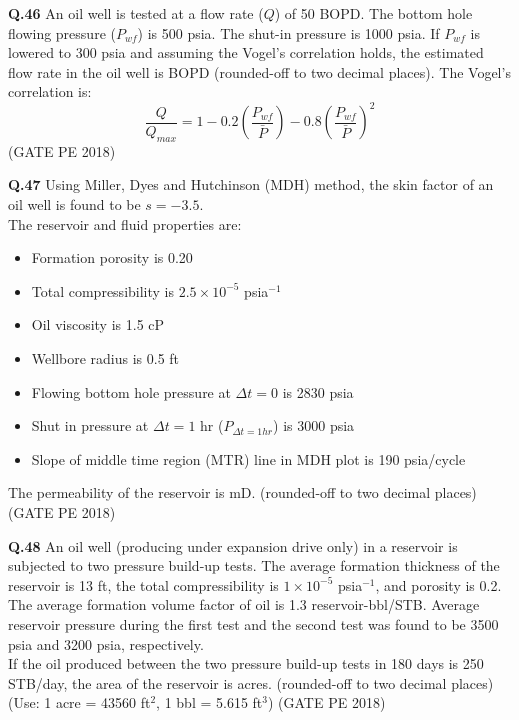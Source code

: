 \documentclass[journal,12pt,onecolumn]{IEEEtran}
\theoremstyle{remark}
\begin{document}
\vspace{1cm}

\noindent\textbf{Q.46} An oil well is tested at a flow rate ($Q$) of 50 BOPD. The bottom hole flowing pressure ($P_{wf}$) is 500 psia. The shut-in pressure is 1000 psia. If $P_{wf}$ is lowered to 300 psia and assuming the Vogel's correlation holds, the estimated flow rate in the oil well is \underline{\hspace{2cm}} BOPD (rounded-off to two decimal places). The Vogel's correlation is:
\[ \frac{Q}{Q_{max}} = 1 - 0.2\left(\frac{P_{wf}}{\bar{P}}\right) - 0.8\left(\frac{P_{wf}}{\bar{P}}\right)^2 \] \hfill (GATE PE 2018)

\pagebreak

\noindent\textbf{Q.47} Using Miller, Dyes and Hutchinson (MDH) method, the skin factor of an oil well is found to be $s = -3.5$. \\ 

The reservoir and fluid properties are: 
\begin{itemize}
  \item Formation porosity is 0.20
  \item Total compressibility is $2.5 \times 10^{-5}$ psia$^{-1}$
  \item Oil viscosity is 1.5 cP
  \item Wellbore radius is 0.5 ft
  \item Flowing bottom hole pressure at $\Delta t = 0$ is 2830 psia
  \item Shut in pressure at $\Delta t = 1$ hr ($P_{\Delta t=1hr}$) is 3000 psia
  \item Slope of middle time region (MTR) line in MDH plot is 190 psia/cycle
\end{itemize}

The permeability of the reservoir is \underline{\hspace{2cm}} mD. (rounded-off to two decimal places) \hfill (GATE PE 2018)

\vspace{1cm}

\noindent\textbf{Q.48} An oil well (producing under expansion drive only) in a reservoir is subjected to two pressure build-up tests. The average formation thickness of the reservoir is 13 ft, the total compressibility is $1\times10^{-5}$ psia$^{-1}$, and porosity is 0.2. The average formation volume factor of oil is 1.3 reservoir-bbl/STB. Average reservoir pressure during the first test and the second test was found to be 3500 psia and 3200 psia, respectively. \\ 
If the oil produced between the two pressure build-up tests in 180 days is 250 STB/day, the area of the reservoir is \underline{\hspace{2cm}} acres. (rounded-off to two decimal places) \\ 
(Use: 1 acre = 43560 ft$^2$, 1 bbl = 5.615 ft$^3$) \hfill (GATE PE 2018)
\end{document}

